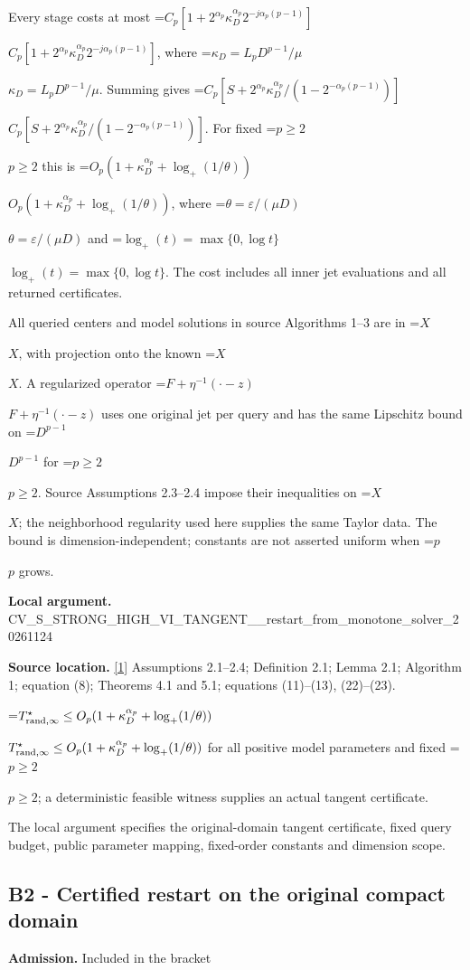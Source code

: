\documentclass[10pt,a4paper]{article}
\newcommand{\AtlasMath}[1]{\par\begingroup\centering\setbox0=\hbox{$\displaystyle #1$}\ifdim\wd0>1.4\linewidth\typeout{ATLAS WIDE FORMULA: \the\wd0}\fi\ifdim\wd0>\linewidth\resizebox{\linewidth}{!}{\box0}\else\box0\fi\par\endgroup}
\newcommand{\AtlasInlineMath}[1]{\begingroup\setbox0=\hbox{$#1$}\ifdim\wd0>.4\linewidth\endgroup\AtlasMath{#1}\else\endgroup$#1$\fi}
\begin{document}
Every stage costs at most \AtlasInlineMath{C_p[1+2^{\alpha_p}\kappa_D^{\alpha_p}2^{-j\alpha_p(p-1)}]}, where \AtlasInlineMath{\kappa_D=L_pD^{p-1}/\mu}. Summing gives \AtlasInlineMath{C_p[S+2^{\alpha_p}\kappa_D^{\alpha_p}/(1-2^{-\alpha_p(p-1)})]}. For fixed \AtlasInlineMath{p\ge2} this is \AtlasInlineMath{O_p(1+\kappa_D^{\alpha_p}+\log_+(1/\theta))}, where \AtlasInlineMath{\theta=\varepsilon/(\mu D)} and \AtlasInlineMath{\log_+(t)=\max\{0,\log t\}}. The cost includes all inner jet evaluations and all returned certificates.

All queried centers and model solutions in source Algorithms 1--3 are in \AtlasInlineMath{X}, with projection onto the known \AtlasInlineMath{X}. A regularized operator \AtlasInlineMath{F+\eta^{-1}(\cdot-z)} uses one original jet per query and has the same Lipschitz bound on \AtlasInlineMath{D^{p-1}} for \AtlasInlineMath{p\ge2}. Source Assumptions 2.3--2.4 impose their inequalities on \AtlasInlineMath{X}; the neighborhood regularity used here supplies the same Taylor data. The bound is dimension-independent; constants are not asserted uniform when \AtlasInlineMath{p} grows.



\textbf{Local argument.} CV\_S\_STRONG\_HIGH\_VI\_TANG\allowbreak{}ENT\_\_restart\_from\_monoto\allowbreak{}ne\_solver\_20261124



\textbf{Source location.} \href{https://arxiv.org/pdf/2609.23557v1}{[1]} Assumptions 2.1--2.4; Definition 2.1; Lemma 2.1; Algorithm 1; equation (8); Theorems 4.1 and 5.1; equations (11)--(13), (22)--(23).



\AtlasInlineMath{T^\star_{{\rm rand},\infty}\le O_p(1+\kappa_D^{\alpha_p}+\log_+(1/\theta))} for all positive model parameters and fixed \AtlasInlineMath{p\ge2}; a deterministic feasible witness supplies an actual tangent certificate.



The local argument specifies the original-domain tangent certificate, fixed query budget, public parameter mapping, fixed-order constants and dimension scope.



\subsection{B2 - Certified restart on the original compact domain}


\textbf{Admission.} Included in the bracket
\end{document}
